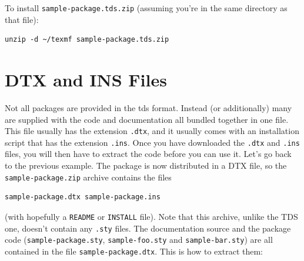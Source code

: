 To install \texttt{sample-package.tds.zip} (assuming you're in the
same directory as that file):
\begin{verbatim}
unzip -d ~/texmf sample-package.tds.zip
\end{verbatim}

\section{DTX and INS Files}
\label{sec:dtx}
Not all packages are
provided in the \gls{tds} format. Instead (or additionally) many are supplied
with the code and documentation all bundled together in one file.
This file usually has the extension \texttt{.dtx}, and it usually
comes with an installation script that has the extension
\texttt{.ins}. Once you have downloaded the \texttt{.dtx} and
\texttt{.ins} files, you will then have to extract the code before
you can use it. Let's go back to the previous example. The package
 is now distributed in a DTX file, so the
\texttt{sample-package.zip} archive contains the files
\begin{verbatim}
sample-package.dtx sample-package.ins
\end{verbatim}
(with hopefully a \texttt{README} or \texttt{INSTALL} file). Note
that this archive, unlike the TDS one, doesn't contain any
\texttt{.sty} files. The documentation source and the package code
(\texttt{sample-package.sty}, \texttt{sample-foo.sty} and
\texttt{sample-bar.sty}) are all contained in the file
\texttt{sample-package.dtx}. This is how to extract them:
